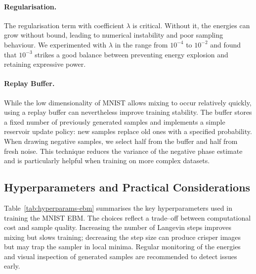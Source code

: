 \paragraph{Regularisation.}
The regularisation term with coefficient $\lambda$ is critical.  Without
it, the energies can grow without bound, leading to numerical instability
and poor sampling behaviour.  We experimented with $\lambda$ in the range
from $10^{-4}$ to $10^{-2}$ and found that $10^{-3}$ strikes a good balance
between preventing energy explosion and retaining expressive power.

\paragraph{Replay Buffer.}
While the low dimensionality of MNIST allows mixing to occur relatively
quickly, using a replay buffer can nevertheless improve training stability.
The buffer stores a fixed number of previously generated samples and
implements a simple reservoir update policy: new samples replace old ones
with a specified probability.  When drawing negative samples, we select
half from the buffer and half from fresh noise.  This technique reduces the
variance of the negative phase estimate and is particularly helpful when
training on more complex datasets.

\subsection{Hyperparameters and Practical Considerations}

Table~\ref{tab:hyperparams-ebm} summarises the key hyperparameters used
in training the MNIST EBM.  The choices reflect a trade–off between
computational cost and sample quality.  Increasing the number of Langevin
steps improves mixing but slows training; decreasing the step size can
produce crisper images but may trap the sampler in local minima.  Regular
monitoring of the energies and visual inspection of generated samples are
recommended to detect issues early.

